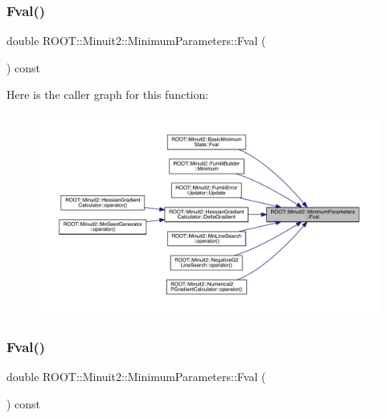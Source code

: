\mbox{\label{classROOT_1_1Minuit2_1_1MinimumParameters_a1f9cd63f5947771e367bedd4dafa54e3}} 
\subsubsection{\texorpdfstring{Fval()}{Fval()}\hspace{0.1cm}{\footnotesize\ttfamily [1/2]}}
{\footnotesize\ttfamily double R\+O\+O\+T\+::\+Minuit2\+::\+Minimum\+Parameters\+::\+Fval (\begin{DoxyParamCaption}{ }\end{DoxyParamCaption}) const\hspace{0.3cm}{\ttfamily [inline]}}

Here is the caller graph for this function\+:\nopagebreak
\begin{figure}[H]
\begin{center}
\leavevmode
\includegraphics[width=350pt]{db/db8/classROOT_1_1Minuit2_1_1MinimumParameters_a1f9cd63f5947771e367bedd4dafa54e3_icgraph}
\end{center}
\end{figure}
\mbox{\label{classROOT_1_1Minuit2_1_1MinimumParameters_a1f9cd63f5947771e367bedd4dafa54e3}} 
\subsubsection{\texorpdfstring{Fval()}{Fval()}\hspace{0.1cm}{\footnotesize\ttfamily [2/2]}}
{\footnotesize\ttfamily double R\+O\+O\+T\+::\+Minuit2\+::\+Minimum\+Parameters\+::\+Fval (\begin{DoxyParamCaption}{ }\end{DoxyParamCaption}) const\hspace{0.3cm}{\ttfamily [inline]}}

